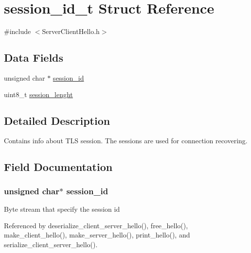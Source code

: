 \hypertarget{structsession__id__t}{}\section{session\+\_\+id\+\_\+t Struct Reference}
\label{structsession__id__t}


{\ttfamily \#include $<$Server\+Client\+Hello.\+h$>$}

\subsection*{Data Fields}
\begin{DoxyCompactItemize}
\item 
unsigned char $\ast$ \hyperlink{structsession__id__t_a16b10327d41aa891822609659111d1a1}{session\+\_\+id}
\item 
uint8\+\_\+t \hyperlink{structsession__id__t_a9215daa8dba2536b15b9029e18017c3a}{session\+\_\+lenght}
\end{DoxyCompactItemize}


\subsection{Detailed Description}
Contains info about T\+LS session. The sessions are used for connection recovering. 

\subsection{Field Documentation}
\subsubsection[{\texorpdfstring{session\+\_\+id}{session_id}}]{\setlength{\rightskip}{0pt plus 5cm}unsigned char$\ast$ session\+\_\+id}\hypertarget{structsession__id__t_a16b10327d41aa891822609659111d1a1}{}\label{structsession__id__t_a16b10327d41aa891822609659111d1a1}
Byte stream that specify the session id 

Referenced by deserialize\+\_\+client\+\_\+server\+\_\+hello(), free\+\_\+hello(), make\+\_\+client\+\_\+hello(), make\+\_\+server\+\_\+hello(), print\+\_\+hello(), and serialize\+\_\+client\+\_\+server\+\_\+hello().

